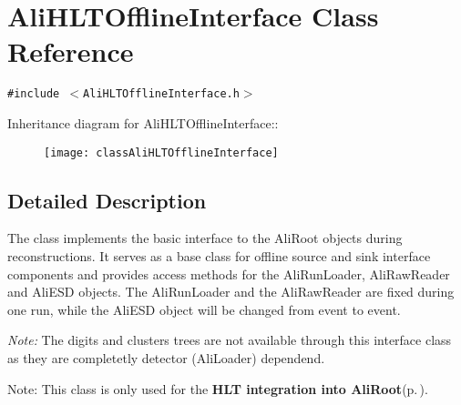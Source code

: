 \section{Ali\-HLTOffline\-Interface Class Reference}
\label{classAliHLTOfflineInterface}
{\tt \#include $<$Ali\-HLTOffline\-Interface.h$>$}

Inheritance diagram for Ali\-HLTOffline\-Interface::\begin{figure}[H]
\begin{center}
\leavevmode
\texttt{[image: classAliHLTOfflineInterface]}
\end{center}
\end{figure}


\subsection{Detailed Description}
The class implements the basic interface to the Ali\-Root objects during reconstructions. It serves as a base class for offline source and sink interface components and provides access methods for the Ali\-Run\-Loader, Ali\-Raw\-Reader and Ali\-ESD objects. The Ali\-Run\-Loader and the Ali\-Raw\-Reader are fixed during one run, while the Ali\-ESD object will be changed from event to event.\par
 {\em Note:\/} The digits and clusters trees are not available through this interface class as they are completetly detector (Ali\-Loader) dependend.

\begin{Desc}
\item[Note:]This class is only used for the {\bf HLT integration into Ali\-Root}{\rm (p.\,\pageref{group__alihlt__system})}. \end{Desc}




